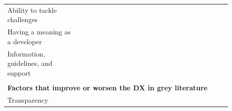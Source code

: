 \documentclass[english, 12pt, a4paper, sci, utf8, a-1b, online]{aaltothesis}
\begin{document}
{\begin{center}
\begin{longtable}{p{0.3\linewidth}p{0.6\linewidth}}
      Ability to tackle challenges            & \textcite{pinter2019polymorph} \newline \textcite{ivo2018approach} \newline \textcite{zhang2018toward} \newline \textcite{what-happens-when-unhappy}                                                                                                                                                                        \\
      Having a meaning as a developer         & \textcite{fagerholm2014examining} \newline \textcite{fontao2017investigating}                                                                                                                                                                                                                                               \\
      Information, guidelines, and support    & \textcite{de2017towards} \newline \textcite{myers2016improving} \newline \textcite{macvean2016api} \newline \textcite{claussen2019role} \newline \textcite{chatley2019supporting} \newline \textcite{nazariodetecting} \newline \textcite{henriques2018improving} \newline \textcite{fontao2018mobile}                      \\
                                              &                                                                                                                                                                                                                                                                                                                             \\
      \multicolumn{2}{l}{\textbf{Factors that improve or worsen the DX in grey literature}}                                                                                                                                                                                                                                                                                 \\*
      Transparency                            & \textcite{workflows-for-the-new-developer-experience} \newline \textcite{4-apis-doing-developer-experience-really-well} \newline \textcite{dx-devs-are-people-too}                                                                                                                                                          \\

\end{longtable}
\end{center}}
\end{document}

